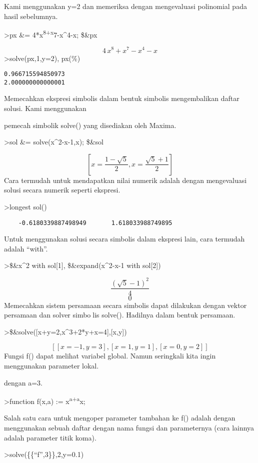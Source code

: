 \documentclass[
]{book}
\begin{document}
Kami menggunakan y=2 dan memeriksa dengan mengevaluasi polinomial pada hasil sebelumnya.

\textgreater px \&= 4*x\textsuperscript{8+x}7-x\^{}4-x; \$\&px

\[4\,x^8+x^7-x^4-x\]\textgreater solve(px,1,y=2), px(\%)

\begin{verbatim}
0.966715594850973
2.000000000000001
\end{verbatim}

Memecahkan ekspresi simbolis dalam bentuk simbolis mengembalikan daftar solusi. Kami menggunakan

pemecah simbolik solve() yang disediakan oleh Maxima.

\textgreater sol \&= solve(x\^{}2-x-1,x); \$\&sol

\[\left[ x=\frac{1-\sqrt{5}}{2} , x=\frac{\sqrt{5}+1}{2} \right] \]Cara termudah untuk mendapatkan nilai numerik adalah dengan mengevaluasi solusi secara numerik seperti ekspresi.

\textgreater longest sol()

\begin{verbatim}
    -0.6180339887498949       1.618033988749895 
\end{verbatim}

Untuk menggunakan solusi secara simbolis dalam ekspresi lain, cara termudah adalah ``with''.

\textgreater\$\&x\^{}2 with sol{[}1{]}, \$\&expand(x\^{}2-x-1 with sol{[}2{]})

\[\frac{\left(\sqrt{5}-1\right)^2}{4}\]\[0\]Memecahkan sistem persamaan secara simbolis dapat dilakukan dengan vektor persamaan dan solver simbolis solve(). Hadilnya dalam bentuk persamaan.

\textgreater\$\&solve({[}x+y=2,x\^{}3+2*y+x=4{]},{[}x,y{]})

\[\left[ \left[ x=-1 , y=3 \right]  , \left[ x=1 , y=1 \right]  , 
 \left[ x=0 , y=2 \right]  \right] \]Fungsi f() dapat melihat variabel global. Namun seringkali kita ingin menggunakan parameter lokal.

dengan a=3.

\textgreater function f(x,a) := x\textsuperscript{a+a}x;

Salah satu cara untuk mengoper parameter tambahan ke f() adalah dengan menggunakan sebuah daftar dengan nama fungsi dan parameternya (cara lainnya adalah parameter titik koma).

\textgreater solve(\{\{``f'',3\}\},2,y=0.1)
\end{document}

